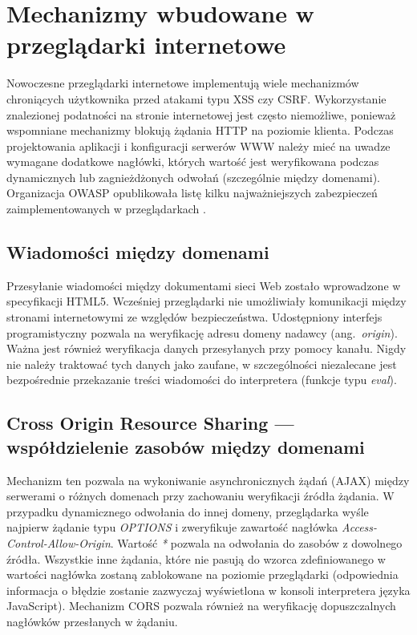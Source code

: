 \documentclass[11pt,a4paper,polish,thesis]{dcsbook}
\begin{document}
\section{Mechanizmy wbudowane w przeglądarki internetowe}
Nowoczesne przeglądarki internetowe implementują wiele mechanizmów chroniących użytkownika przed atakami typu XSS czy CSRF. Wykorzystanie znalezionej podatności na stronie internetowej jest często niemożliwe, ponieważ wspomniane mechanizmy blokują żądania HTTP na poziomie klienta. Podczas projektowania aplikacji i konfiguracji serwerów WWW należy mieć na uwadze wymagane dodatkowe nagłówki, których wartość jest weryfikowana podczas dynamicznych lub zagnieżdżonych odwołań (szczególnie między domenami). Organizacja OWASP opublikowała listę kilku najważniejszych zabezpieczeń zaimplementowanych w przeglądarkach \cite{html5security}.

\subsection{Wiadomości między domenami}
Przesyłanie wiadomości między dokumentami sieci Web zostało wprowadzone w specyfikacji HTML5. Wcześniej przeglądarki nie umożliwiały komunikacji między stronami internetowymi ze względów bezpieczeństwa. Udostępniony interfejs programistyczny pozwala na weryfikację adresu domeny nadawcy (ang.~\textit{origin}). Ważna jest również weryfikacja danych przesyłanych przy pomocy kanału. Nigdy nie należy traktować tych danych jako zaufane, w szczególności niezalecane jest bezpośrednie przekazanie treści wiadomości do interpretera (funkcje typu \textit{eval}).

\subsection{Cross Origin Resource Sharing --- współdzielenie zasobów między domenami}
Mechanizm ten pozwala na wykoniwanie asynchronicznych żądań (AJAX) między serwerami o różnych domenach przy zachowaniu weryfikacji źródła żądania. W przypadku dynamicznego odwołania do innej domeny, przeglądarka wyśle najpierw żądanie typu \textit{OPTIONS} i zweryfikuje zawartość nagłówka \textit{Access-Control-Allow-Origin}. Wartość \textit{*} pozwala na odwołania do zasobów z dowolnego źródła. Wszystkie inne żądania, które nie pasują do wzorca zdefiniowanego w wartości nagłówka zostaną zablokowane na poziomie przeglądarki (odpowiednia informacja o błędzie zostanie zazwyczaj wyświetlona w konsoli interpretera języka JavaScript). Mechanizm CORS pozwala również na weryfikację dopuszczalnych nagłówków przesłanych w żądaniu.
\end{document}
